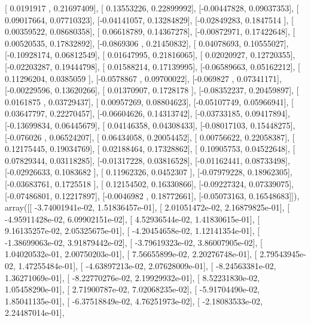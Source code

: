 \documentclass{article}
\begin{document}
       [ 0.0191917 ,  0.21697409],
       [ 0.13553226,  0.22899992],
       [-0.00447828,  0.09037353],
       [ 0.09017664,  0.07710323],
       [-0.04141057,  0.13284829],
       [-0.02849283,  0.1847514 ],
       [ 0.00359522,  0.08680358],
       [ 0.06618789,  0.14367278],
       [-0.00872971,  0.17422648],
       [ 0.00520535,  0.17832892],
       [-0.0869306 ,  0.21450832],
       [ 0.04078693,  0.10555027],
       [-0.10928174,  0.06812549],
       [ 0.01647995,  0.21816065],
       [ 0.02020927,  0.12720355],
       [-0.02203287,  0.19444798],
       [ 0.01588214,  0.17139995],
       [-0.06589663,  0.05162212],
       [ 0.11296204,  0.0385059 ],
       [-0.0578867 ,  0.09700022],
       [-0.069827  ,  0.07341171],
       [-0.00229596,  0.13620266],
       [ 0.01370907,  0.1728178 ],
       [-0.08352237,  0.20459897],
       [ 0.0161875 ,  0.03729437],
       [ 0.00957269,  0.08804623],
       [-0.05107749,  0.05966941],
       [ 0.03647797,  0.22270457],
       [-0.06604626,  0.14313742],
       [-0.03733185,  0.09417894],
       [-0.13699834,  0.06445679],
       [ 0.04146358,  0.04308433],
       [-0.08017103,  0.15448275],
       [-0.076026  ,  0.06524207],
       [ 0.06434058,  0.20054452],
       [ 0.00756622,  0.22058387],
       [ 0.12175445,  0.19034769],
       [ 0.02188464,  0.17328862],
       [ 0.10905753,  0.04522648],
       [ 0.07829344,  0.03118285],
       [-0.01317228,  0.03816528],
       [-0.01162441,  0.08733498],
       [-0.02926633,  0.1083682 ],
       [ 0.11962326,  0.0452307 ],
       [-0.07979228,  0.18962305],
       [-0.03683761,  0.1725518 ],
       [ 0.12154502,  0.16330866],
       [-0.09227324,  0.07339075],
       [-0.07486801,  0.12217897],
       [-0.0046982 ,  0.18772661],
       [-0.05073163,  0.16548683]]), array([[ -3.74001941e-02,   1.51836457e-01],
       [  2.01051472e-02,   2.16879825e-01],
       [ -4.95911428e-02,   6.09902151e-02],
       [  4.52936544e-02,   1.41830615e-01],
       [  9.16135257e-02,   2.05325675e-01],
       [ -4.20454658e-02,   1.12141354e-01],
       [ -1.38699063e-02,   3.91879442e-02],
       [ -3.79619323e-02,   3.86007905e-02],
       [  1.04020532e-01,   2.00750203e-01],
       [  7.56655899e-02,   2.20276748e-01],
       [  2.79543945e-02,   1.47255484e-01],
       [ -4.63897213e-02,   2.07628009e-01],
       [ -8.24563381e-02,   1.36271069e-01],
       [ -8.22770276e-02,   2.19929932e-01],
       [  8.52231830e-02,   1.05458290e-01],
       [  2.71900787e-02,   7.02068235e-02],
       [ -5.91704490e-02,   1.85041135e-01],
       [ -6.37518849e-02,   4.76251973e-02],
       [ -2.18083533e-02,   2.24487014e-01],
\end{document}
